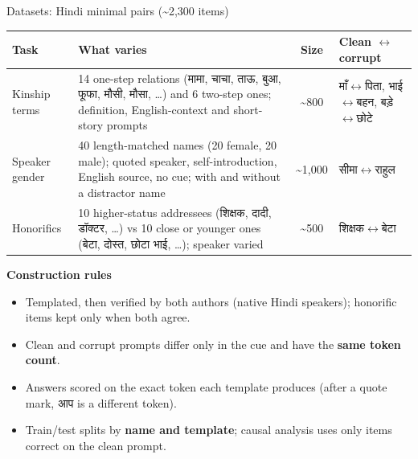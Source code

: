 \documentclass[aspectratio=169,10pt]{beamer}
\newcommand{\hi}[1]{{\devfont #1}}
\begin{document}
\begin{frame}{Datasets: Hindi minimal pairs (\textasciitilde2,300 items)}
\footnotesize
\begin{tabularx}{\textwidth}{@{}l Y c l@{}}
\toprule
\textbf{Task} & \textbf{What varies} & \textbf{Size} & \textbf{Clean \(\leftrightarrow\) corrupt} \\
\midrule
Kinship terms & 14 one-step relations (\hi{मामा, चाचा, ताऊ, बुआ, फूफा, मौसी, मौसा}, \dots) and 6 two-step ones; definition, English-context and short-story prompts & \textasciitilde800 & \hi{माँ}\(\leftrightarrow\)\hi{पिता}, \hi{भाई}\(\leftrightarrow\)\hi{बहन}, \hi{बड़े}\(\leftrightarrow\)\hi{छोटे} \\[3pt]
Speaker gender & 40 length-matched names (20 female, 20 male); quoted speaker, self-introduction, English source, no cue; with and without a distractor name & \textasciitilde1,000 & \hi{सीमा}\(\leftrightarrow\)\hi{राहुल} \\[3pt]
Honorifics & 10 higher-status addressees (\hi{शिक्षक, दादी, डॉक्टर}, \dots) vs 10 close or younger ones (\hi{बेटा, दोस्त, छोटा भाई}, \dots); speaker varied & \textasciitilde500 & \hi{शिक्षक}\(\leftrightarrow\)\hi{बेटा} \\
\bottomrule
\end{tabularx}

\vspace{0.5em}
\textbf{Construction rules}
\begin{itemize}
  \setlength\itemsep{0.05em}
  \item Templated, then verified by both authors (native Hindi speakers); honorific items kept only when both agree.
  \item Clean and corrupt prompts differ only in the cue and have the \textbf{same token count}.
  \item Answers scored on the exact token each template produces (after a quote mark, \hi{आप} is a different token).
  \item Train/test splits by \textbf{name and template}; causal analysis uses only items correct on the clean prompt.
\end{itemize}
\end{frame}
\end{document}
